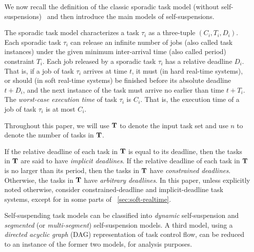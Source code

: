 \label{sec:model}

We now recall the definition of the classic sporadic task model (without self-suspensions)~\cite{Liu_1973,Mok:1983:FDP:888951} and then introduce the main models of self-suspensions. 

The sporadic task model characterizes a task $\tau_i$ as a three-tuple $(C_i,T_i,D_i)$. Each sporadic task $\tau_i$ can release an infinite number of jobs (also called task instances) under the given minimum inter-arrival time (also called period) constraint $T_i$.  Each job released by a sporadic task $\tau_i$ has a relative deadline $D_i$.  That is, if a job of task $\tau_i$ arrives at time $t$, it must (in hard real-time systems), or should (in soft real-time systems) be finished before its absolute deadline $t+D_i$, and the next instance of the task must arrive no earlier than time $t + T_i$.
The \emph{worst-case execution time} of task $\tau_i$ is $C_i$. That is, the execution time of a job of task $\tau_i$ is at most $C_i$.

Throughout this paper, we will use ${\bf T}$ to denote the input task
set and use $n$ to denote the number of tasks in ${\bf T}$. 

If the relative deadline of each task in ${\bf T}$ is equal to its deadline, then the tasks in ${\bf T}$ are said to have
\emph{implicit deadlines}. If the relative deadline of
each task in ${\bf T}$ is no larger than its period, then the  tasks in ${\bf T}$ have \emph{constrained deadlines}. Otherwise, the tasks in ${\bf T}$ have \emph{arbitrary deadlines}.
In this paper, unless explicitly noted otherwise,
consider constrained-deadline and
implicit-deadline task systems, except for in some parts of
\mysectionref{}~\ref{sec:soft-realtime}.
  
Self-suspending task models can be classified into \emph{dynamic} self-suspension and \emph{segmented} (or \emph{multi-segment})
self-suspension models. A third model, using a \emph{directed acyclic graph} (DAG) representation of task control flow, can be 
reduced to an instance of the former two models, for analysis purposes.

